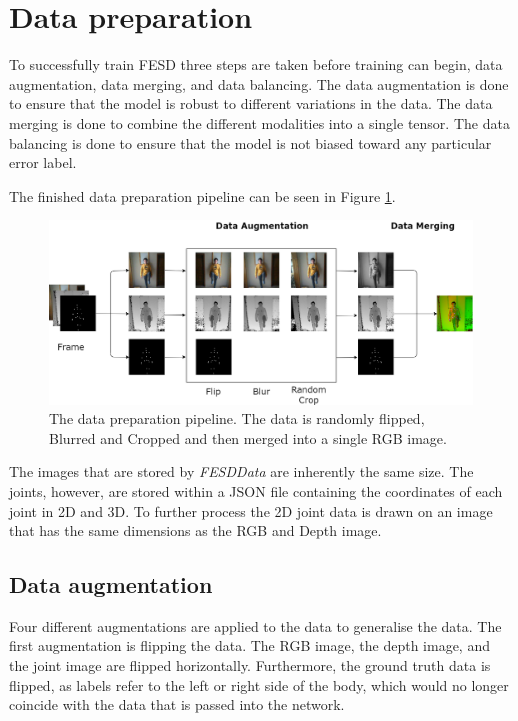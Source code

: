 \section{Data preparation}
\label{sec:data_preparation}

To successfully train FESD three steps are taken before training can begin, data augmentation, data merging, and data balancing. The data augmentation is done to ensure that the model is robust to different variations in the data. The data merging is done to combine the different modalities into a single tensor. The data balancing is done to ensure that the model is not biased toward any particular error label.

The finished data preparation pipeline can be seen in Figure \ref{fig:data_preparation_pipeline}.

\begin{figure}
  \centering
  \includegraphics[width=\linewidth]{figures/ProcessingPipeline/DataProcessing.png}
  \caption[Data preparation pipeline]{The data preparation pipeline. The data is randomly flipped, Blurred and Cropped and then merged into a single RGB image.}
  \label{fig:data_preparation_pipeline}
\end{figure}

The images that are stored by \textit{FESDData} are inherently the same size. The joints, however, are stored within a JSON file containing the coordinates of each joint in 2D and 3D. To further process the 2D joint data is drawn on an image that
 has the same dimensions as the RGB and Depth image.

\subsection{Data augmentation}

Four different augmentations are applied to the data to generalise the data. The first augmentation is flipping the data. The RGB image, the depth image, and the joint image are flipped horizontally. Furthermore, the ground truth data is flipped, as labels refer to the left or right side of the body, which would no longer coincide with the data that is passed into the network.

